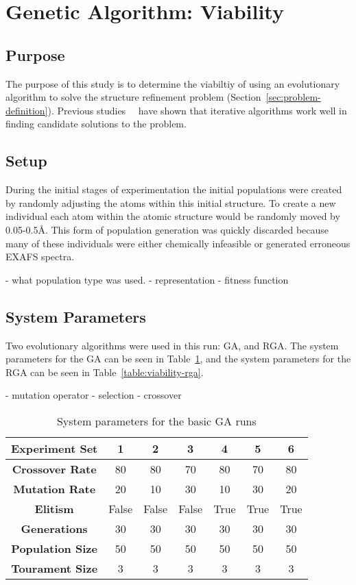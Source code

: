 \section{Genetic Algorithm: Viability}

\subsection{Purpose}

The purpose of this study is to determine the viabiltiy of using an evolutionary algorithm to solve the structure refinement problem (Section~\ref{sec:problem-definition}). Previous studies~\cite{sproviero2008model}~\cite{luber2011s1} have shown that iterative algorithms work well in finding candidate solutions to the problem.

\subsection{Setup}

During the initial stages of experimentation the initial populations were created by randomly adjusting the atoms within this initial structure. To create a new individual each atom within the atomic structure would be randomly moved by 0.05-0.5\AA. This form of population generation was quickly discarded because many of these individuals were either chemically infeasible or generated erroneous EXAFS spectra. 

- what population type was used.
- representation
- fitness function

\subsection{System Parameters}

Two evolutionary algorithms were used in this run: GA, and RGA. The system parameters for the GA can be seen in Table~\ref{table:viability-ga}, and the system parameters for the RGA can be seen in Table~\ref{table:viability-rga}.

- mutation operator
- selection
- crossover

\begin{table}
	\label{table:viability-ga}
	\centering
	\begin{tabular}{ | >{\bfseries}c | c | c | c | c | c | c | }
		\hline
		Experiment Set & 1 & 2 & 3 & 4 & 5 & 6 \\ \hline
		Crossover Rate & 80 & 80 & 70 & 80 & 70 & 80 \\ \hline
		Mutation Rate & 20 & 10 & 30 & 10 & 30 & 20 \\ \hline
		Elitism & False & False & False & True & True & True \\ \hline
		Generations & 30 & 30 & 30 & 30 & 30 & 30 \\ \hline
		Population Size & 50 & 50 & 50 & 50 & 50 & 50 \\ \hline
		Tourament Size & 3 & 3 & 3 & 3 & 3 & 3 \\ \hline
	\end{tabular}
	\caption{System parameters for the basic GA runs}
\end{table}

